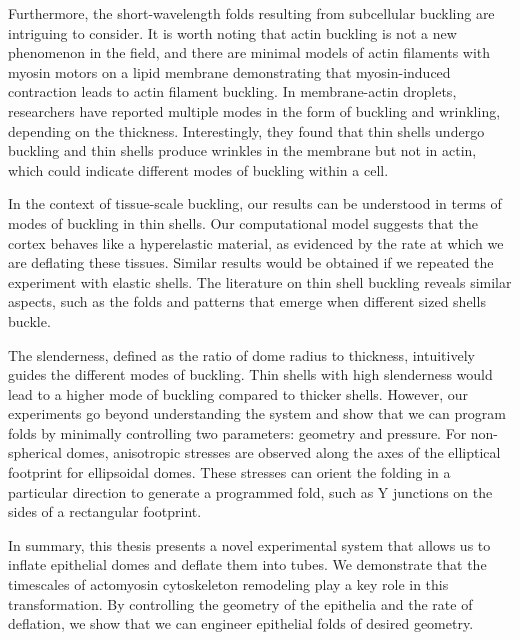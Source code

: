 Furthermore, the short-wavelength folds resulting from subcellular
buckling are intriguing to consider. It is worth noting that actin
buckling is not a new phenomenon in the field, and there are minimal
models of actin filaments with myosin motors on a lipid membrane
demonstrating that myosin-induced contraction leads to actin filament
buckling. In membrane-actin droplets, researchers have reported multiple
modes in the form of buckling and wrinkling, depending on the thickness.
Interestingly, they found that thin shells undergo buckling and thin
shells produce wrinkles in the membrane but not in actin, which could
indicate different modes of buckling within a cell.

In the context of tissue-scale buckling, our results can be understood
in terms of modes of buckling in thin shells. Our computational model
suggests that the cortex behaves like a hyperelastic material, as
evidenced by the rate at which we are deflating these tissues. Similar
results would be obtained if we repeated the experiment with elastic
shells. The literature on thin shell buckling reveals similar aspects,
such as the folds and patterns that emerge when different sized shells
buckle.

The slenderness, defined as the ratio of dome radius to thickness,
intuitively guides the different modes of buckling. Thin shells with
high slenderness would lead to a higher mode of buckling compared to
thicker shells. However, our experiments go beyond understanding the
system and show that we can program folds by minimally controlling two
parameters: geometry and pressure. For non-spherical domes, anisotropic
stresses are observed along the axes of the elliptical footprint for
ellipsoidal domes. These stresses can orient the folding in a particular
direction to generate a programmed fold, such as Y junctions on the
sides of a rectangular footprint.

In summary, this thesis presents a novel experimental system that allows
us to inflate epithelial domes and deflate them into tubes. We
demonstrate that the timescales of actomyosin cytoskeleton remodeling
play a key role in this transformation. By controlling the geometry of
the epithelia and the rate of deflation, we show that we can engineer
epithelial folds of desired geometry.
